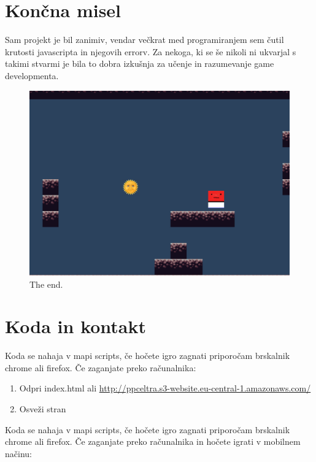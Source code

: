 \documentclass[a4paper,11pt]{article}
\begin{document}
\section{Končna misel}

Sam projekt je bil zanimiv, vendar večkrat med programiranjem sem čutil krutosti javascripta in njegovih errorv. Za nekoga, ki se še nikoli ni ukvarjal s takimi stvarmi je bila to dobra izkušnja za učenje in razumevanje game developmenta. 

\begin{figure}[htbp]
	\begin{center}
		\includegraphics[scale=0.4]{thegame.png}
		\caption{The end.}
		\label{game_scr}
	\end{center}
\end{figure}
\pagebreak

\section{Koda in kontakt}

Koda se nahaja v mapi scripts, če hočete igro zagnati priporočam brskalnik chrome ali firefox. Če zaganjate preko računalnika:
\begin{enumerate}
	\item Odpri index.html ali \url{http://ppceltra.s3-website.eu-central-1.amazonaws.com/}
	\item Osveži stran
\end{enumerate}

Koda se nahaja v mapi scripts, če hočete igro zagnati priporočam brskalnik chrome ali firefox. Če zaganjate preko računalnika in hočete igrati v mobilnem načinu:
\end{document}
